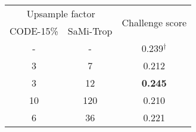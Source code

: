 \begin{tabular}{ccc}
\toprule
\multicolumn{2}{c}{Upsample factor} & \multirow{2}{*}{Challenge score} \\ \cmidrule(lr){1-2}
CODE-15\% & SaMi-Trop               &                                  \\ \midrule
-         & -                       & 0.239$^\dagger$                        \\
3         & 7                       & 0.212                            \\
3         & 12                      & \textbf{0.245}                   \\
10        & 120                     & 0.210                            \\
6         & 36                      & 0.221                            \\
\bottomrule
\end{tabular}
